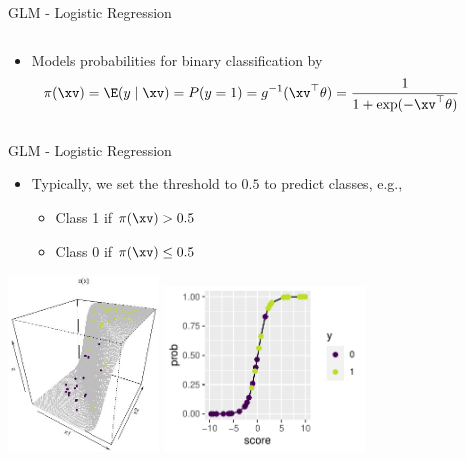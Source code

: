 \documentclass[11pt,compress,t,notes=noshow, aspectratio=169, xcolor=table]{beamer}
\begin{document}
\begin{frame}{GLM - Logistic Regression}
\begin{columns}[T, totalwidth=\textwidth]
\begin{column}{0.65\textwidth}
\begin{itemize}
    \item Models probabilities for binary classification by
    $$\pi(\xv) = \E(y \mid \xv) = P(y = 1) = g^{-1}(\xv^\top \theta) = \frac{1}{1 + \exp(- \xv^\top \theta)} $$
\end{itemize}
\end{column}
\begin{column}{0.35\textwidth}
\end{column}
\end{columns}

\end{frame}



\begin{frame}{GLM - Logistic Regression}

\begin{itemize}
    \item Typically, we set the threshold to $0.5$ to predict classes, e.g.,
    \begin{itemize}
        \item Class 1 if $\pi(\xv) > 0.5$
        \item Class 0 if $\pi(\xv) \leq 0.5$
    \end{itemize}
\end{itemize}

\centering
\includegraphics[width=0.3\textwidth]{figure/logreg-2vars-surface.png} \qquad
\includegraphics[width=0.4\textwidth]{figure/reg_class_log_7} 
\end{frame}
\end{document}

